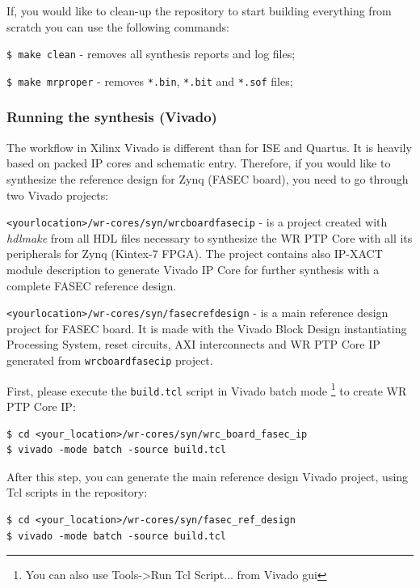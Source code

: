 \documentclass[a4paper, 12pt]{article}
\renewcommand{\_}{\underscore\allowbreak}
\begin{document}
If, you would like to clean-up the repository to start building everything from
scratch you can use the following commands:
\begin{itemize*}
\item \texttt{\$ make clean} - removes all synthesis reports and log files;
\item \texttt{\$ make mrproper} - removes \texttt{*.bin}, \texttt{*.bit} and
  \texttt{*.sof} files;
\end{itemize*}

\subsubsection{Running the synthesis (Vivado)}
The workflow in Xilinx Vivado is different than for ISE and Quartus. It is
heavily based on packed IP cores and schematic entry. Therefore, if you would
like to synthesize the reference design for Zynq (FASEC board), you
need to go through two Vivado projects:
\begin{itemize*}
  \item \texttt{<your\_location>/wr-cores/syn/wrc\_board\_fasec\_ip} - is a
    project created with \textit{hdlmake} from all HDL files necessary to
    synthesize the WR PTP Core with all its peripherals for Zynq (Kintex-7 FPGA).
    The project contains also IP-XACT module description to generate Vivado IP
    Core for further synthesis with a complete FASEC reference design.
  \item \texttt{<your\_location>/wr-cores/syn/fasec\_ref\_design} - is a main
    reference design project for FASEC board. It is made with the Vivado Block
    Design instantiating Processing System, reset circuits, AXI interconnects
    and WR PTP Core IP generated from \texttt{wrc\_board\_fasec\_ip} project.
\end{itemize*}

First, please execute the \texttt{build.tcl} script in Vivado batch mode
\footnote{You can also use Tools->Run Tcl Script... from Vivado gui} to create
WR PTP Core IP:
\begin{lstlisting}
$ cd <your_location>/wr-cores/syn/wrc_board_fasec_ip
$ vivado -mode batch -source build.tcl
\end{lstlisting}

After this step, you can generate the main reference design Vivado project,
using Tcl scripts in the repository:
\begin{lstlisting}
$ cd <your_location>/wr-cores/syn/fasec_ref_design
$ vivado -mode batch -source build.tcl
\end{lstlisting}
\end{document}
